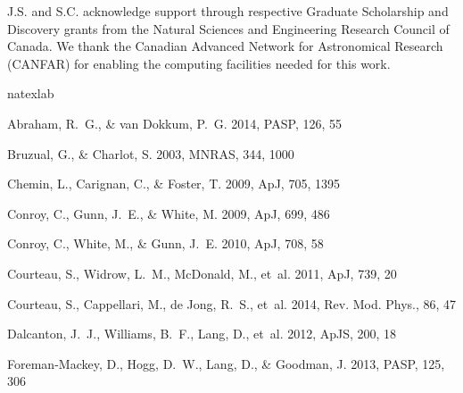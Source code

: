 \documentclass{iau}
\newcommand{\apj}{ApJ}           %
\newcommand{\mnras}{MNRAS}       %
\newcommand{\pasp}{PASP}
\newcommand{\apjs}{ApJS}           %
\begin{document}
\noindent J.S. and S.C. acknowledge support through respective Graduate Scholarship and Discovery grants from the Natural Sciences and Engineering Research Council of Canada. We thank the Canadian Advanced Network for Astronomical Research (CANFAR) for enabling the computing facilities needed for this work.

\begin{thebibliography}{19}
\expandafter\ifx\csname natexlab\endcsname\relax\def\natexlab#1{#1}\fi

{Abraham}, R.~G., \& {van Dokkum}, P.~G. 2014, \pasp, 126, 55

{Bruzual}, G., \& {Charlot}, S. 2003, \mnras, 344, 1000

{Chemin}, L., {Carignan}, C., \& {Foster}, T. 2009, \apj, 705, 1395

{Conroy}, C., {Gunn}, J.~E., \& {White}, M. 2009, \apj, 699, 486

{Conroy}, C., {White}, M., \& {Gunn}, J.~E. 2010, \apj, 708, 58

{Courteau}, S., {Widrow}, L.~M., {McDonald}, M., {et~al.} 2011, \apj, 739, 20

{Courteau}, S., {Cappellari}, M., {de Jong}, R.~S., {et~al.} 2014, Rev. Mod.
  Phys., 86, 47

{Dalcanton}, J.~J., {Williams}, B.~F., {Lang}, D., {et~al.} 2012, \apjs, 200,
  18

{Foreman-Mackey}, D., {Hogg}, D.~W., {Lang}, D., \& {Goodman}, J. 2013, \pasp,
  125, 306


\end{thebibliography}
\end{document}
